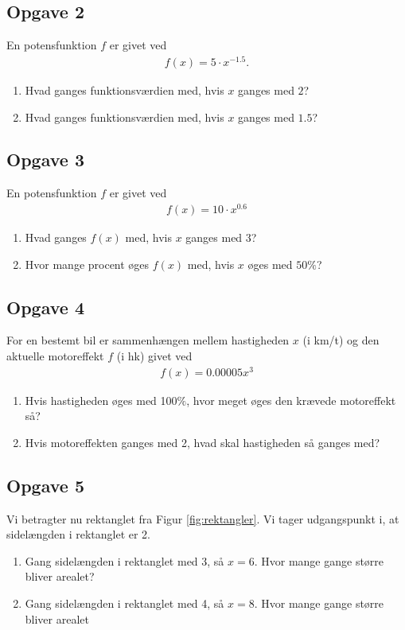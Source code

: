 \subsection*{Opgave 2}
En potensfunktion $f$ er givet ved
\begin{align*}
	f(x) = 5\cdot x^{-1.5}.
\end{align*}
\begin{enumerate}[label=\roman*)]
	\item Hvad ganges funktionsværdien med, hvis $x$ ganges med $2$?
	\item Hvad ganges funktionsværdien med, hvis $x$ ganges med $1.5$?
\end{enumerate}

\subsection*{Opgave 3}
En potensfunktion $f$ er givet ved
\begin{align*}
	f(x) = 10\cdot x^{0.6}
\end{align*}
\begin{enumerate}[label=\roman*)]
	\item Hvad ganges $f(x)$ med, hvis $x$ ganges med $3$?
	\item Hvor mange procent øges $f(x)$ med, hvis $x$ øges med $50\%$?
\end{enumerate}

\subsection*{Opgave 4}
For en bestemt bil er sammenhængen mellem hastigheden $x$ (i km/t) og den aktuelle motoreffekt $f$ (i hk) givet ved
\begin{align*}
	f(x) = 0.00005x^3
\end{align*}
\begin{enumerate}[label=\roman*)]
	\item Hvis hastigheden øges med 100$\%$, hvor meget øges den krævede motoreffekt så?
	\item Hvis motoreffekten ganges med 2, hvad skal hastigheden så ganges med?
\end{enumerate}


\subsection*{Opgave 5}
Vi betragter nu rektanglet fra Figur \ref{fig:rektangler}. Vi tager udgangspunkt i, at sidelængden i rektanglet er 2.
\begin{enumerate}[label = \roman*)]
	\item Gang sidelængden i rektanglet med 3, så $x = 6$. Hvor mange gange større bliver arealet?
	\item Gang sidelængden i rektanglet med 4, så $x = 8$. Hvor mange gange større bliver arealet
\end{enumerate}


